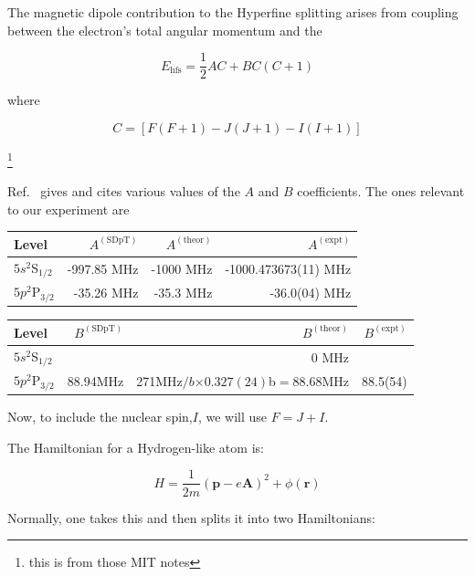 The magnetic dipole contribution to the Hyperfine splitting arises from coupling between the electron's total angular momentum and the 



\begin{equation}
E_{\mathrm{hfs}}=\frac{1}{2}AC+BC(C+1)
\end{equation}

where 

\begin{equation}
C=[F(F+1)-J(J+1)-I(I+1)]
\end{equation}

\footnote{this is from those MIT notes}

Ref.\ \cite{safronova2photon} gives and cites various values of the $A$ and $B$ coefficients. The ones relevant to our experiment are 


\begin{center}
\begin{tabular}{|l|r|r|r|}
\hline
Level &  $A^{\mathrm{(SDpT)}}$ &$A^{\mathrm{(theor)}}$ & $A^{\mathrm{(expt)}}$ \\ \hline \hline
$5s ^2$S$_{1/2}$&-997.85 MHz& -1000 MHz& -1000.473673(11) MHz\\ \hline
$5p ^2$P$_{3/2}$&-35.26 MHz&-35.3 MHz&-36.0(04) MHz\\ \hline
\end{tabular}
\end{center}

\begin{center}
\begin{tabular}{|l|r|r|r|}
\hline
Level &  $B^{\mathrm{(SDpT)}}$ &$B^{\mathrm{(theor)}}$ & $B^{\mathrm{(expt)}}$ \\ \hline \hline
$5s ^2$S$_{1/2}$&&0  MHz&  \\ \hline
$5p ^2$P$_{3/2}$&88.94MHz&271MHz$/b$$\times 0.327(24)$b$=88.68$MHz&88.5(54) \\ \hline
\end{tabular}
\end{center}


Now, to include the nuclear spin,$I$, we will use $F=J+I$. 

The Hamiltonian for a Hydrogen-like atom is: 

\begin{equation}
H=\frac{1}{2m}(\mathbf{p}-e\mathbf{A})^2+\phi(\mathbf{r})
\end{equation}

Normally, one takes this and then splits it into two Hamiltonians: 

